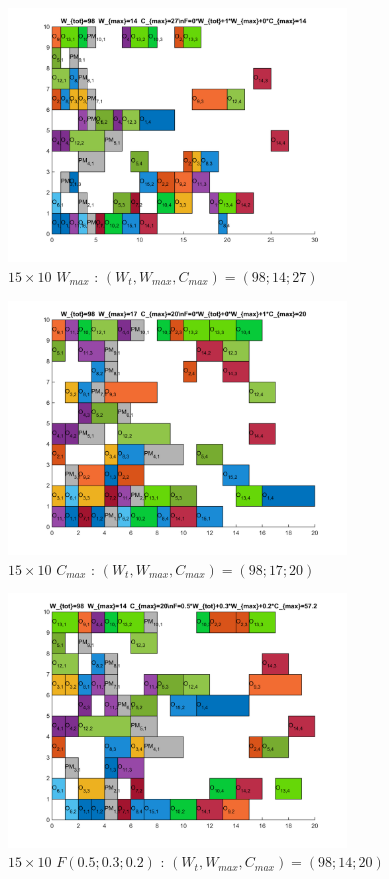 \documentclass[10pt,a4paper]{scrartcl}
\begin{document}
\begin{figure}
  \centering
  \includegraphics[width=0.8\textwidth]{img/results15x10_Wmax.png}
  \caption{$15 \times 10$ $W_{max}$ : $(W_t, W_{max}, C_{max}) = (98; 14; 27)$}
\end{figure}
\begin{figure}
  \centering
  \includegraphics[width=0.8\textwidth]{img/results15x10_Cmax.png}
  \caption{$15 \times 10$ $C_{max}$ : $(W_t, W_{max}, C_{max}) = (98; 17; 20)$}
\end{figure}
\begin{figure}
  \centering
  \includegraphics[width=0.8\textwidth]{img/results15x10_F050302.png}
  \caption{$15 \times 10$ $F(0.5;0.3;0.2)$ : $(W_t, W_{max}, C_{max}) = (98; 14; 20)$}
\end{figure}
\end{document}
